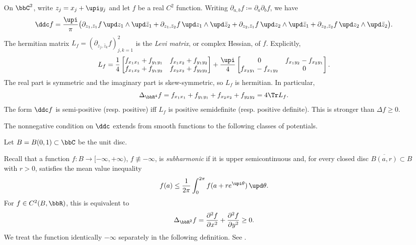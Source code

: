 \begin{example}[label=\labelNFM{eg:ddc-in-complex-2-dimensional}, status=draft, tag=0000000]
	On $\bbC^2$, write $z_j = x_j + \upi y_j$ and let $f$ be a real $C^2$ function.
	Writing $\partial_{a,b}f \coloneqq \partial_a\partial_b f$, we have
	\[ \ddc f = \frac{\upi}{\pi}\bigl(\partial_{z_1,\bar z_1}f\,\upd z_1 \wedge \upd\bar z_1 + \partial_{z_1,\bar z_2}f\,\upd z_1 \wedge \upd\bar z_2 + \partial_{z_2,\bar z_1}f\,\upd z_2 \wedge \upd\bar z_1 + \partial_{z_2,\bar z_2}f\,\upd z_2 \wedge \upd\bar z_2\bigr). \]
	The hermitian matrix $L_f = (\partial_{z_j,\bar z_k}f)_{j,k = 1}^2$ is the \emph{Levi matrix}, or complex Hessian, of $f$.
	Explicitly,
	\[
		L_f = \frac14\begin{bmatrix}
			f_{x_1x_1} + f_{y_1y_1} & f_{x_1x_2} + f_{y_1y_2} \\
			f_{x_1x_2} + f_{y_1y_2} & f_{x_2x_2} + f_{y_2y_2}
		\end{bmatrix}
		+ \frac{\upi}{4}\begin{bmatrix}
			0                       & f_{x_1y_2} - f_{x_2y_1} \\
			f_{x_2y_1} - f_{x_1y_2} & 0
		\end{bmatrix}.
	\]
	The real part is symmetric and the imaginary part is skew-symmetric, so $L_f$ is hermitian.
	In particular,
	\[ \Delta_{\bbR^4}f = f_{x_1x_1} + f_{y_1y_1} + f_{x_2x_2} + f_{y_2y_2} = 4\Tr L_f. \]
	The form $\ddc f$ is semi-positive (resp. positive) iff $L_f$ is positive semidefinite (resp. positive definite).
	This is stronger than $\Delta f \geq 0$.
\end{example}

The nonnegative condition on $\ddc$ extends from smooth functions to the following classes of potentials.

Let $B = B(0,1) \subset \bbC$ be the unit disc.

Recall that a function $f: B \to [-\infty,+\infty)$, $f \not \equiv -\infty$,
is \emph{subharmonic} if it is upper semicontinuous and, for every closed disc $\overline{B(a,r)} \subset B$ with $r > 0$,
satisfies the mean value inequality
\[ f(a) \leq \frac{1}{2\pi}\int_0^{2\pi} f(a + r e^{\upi\theta})\,\upd\theta. \]
For $f \in C^2(B,\bbR)$, this is equivalent to
\[ \Delta_{\bbR^2}f = \frac{\partial^2 f}{\partial x^2} + \frac{\partial^2 f}{\partial y^2} \geq 0. \]
We treat the function identically $-\infty$ separately in the following definition.
See \cite[Chapter~I, \S 4, Theorem and Definition~4.12]{Demailly-2012-ComplexAnalyticDifferential}.

